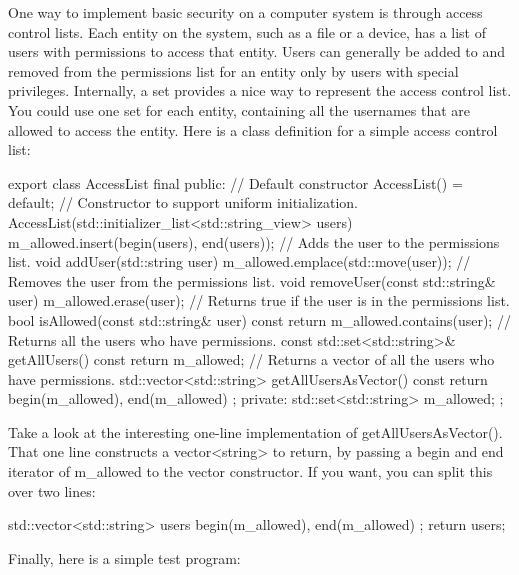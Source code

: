 One way to implement basic security on a computer system is through access control lists. Each entity on the system, such as a file or a device, has a list of users with permissions to access that entity. Users can generally be added to and removed from the permissions list for an entity only by users with special privileges. Internally, a set provides a nice way to represent the access control list. You could use one set for each entity, containing all the usernames that are allowed to access the entity. Here is a class definition for a simple access control list:

\begin{cpp}
export class AccessList final
{
    public:
        // Default constructor
        AccessList() = default;
        // Constructor to support uniform initialization.
        AccessList(std::initializer_list<std::string_view> users)
        {
            m_allowed.insert(begin(users), end(users));
        }
        // Adds the user to the permissions list.
        void addUser(std::string user)
        {
            m_allowed.emplace(std::move(user));
        }
        // Removes the user from the permissions list.
        void removeUser(const std::string& user)
        {
            m_allowed.erase(user);
        }
        // Returns true if the user is in the permissions list.
        bool isAllowed(const std::string& user) const
        {
            return m_allowed.contains(user);
        }
        // Returns all the users who have permissions.
        const std::set<std::string>& getAllUsers() const
        {
            return m_allowed;
        }
        // Returns a vector of all the users who have permissions.
        std::vector<std::string> getAllUsersAsVector() const
        {
            return { begin(m_allowed), end(m_allowed) };
        }
    private:
        std::set<std::string> m_allowed;
};
\end{cpp}

Take a look at the interesting one-line implementation of getAllUsersAsVector(). That one line constructs a vector<string> to return, by passing a begin and end iterator of m\_allowed to the vector constructor. If you want, you can split this over two lines:

\begin{cpp}
std::vector<std::string> users { begin(m_allowed), end(m_allowed) };
return users;
\end{cpp}

Finally, here is a simple test program:

